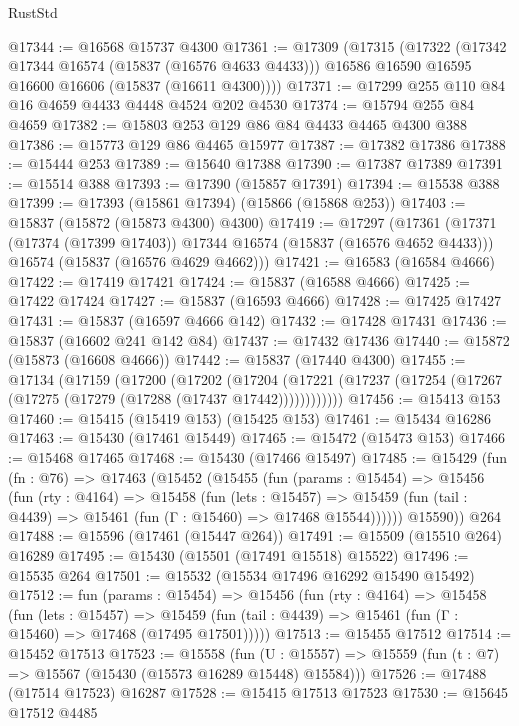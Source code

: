 \begin{lexlean}{RustStd}
\begin{coremodule}
@17344 := @16568 @15737 @4300
@17361 := @17309
    (@17315
      (@17322
        (@17342 @17344 @16574 (@15837 (@16576 @4633 @4433)))
        @16586
        @16590
        @16595
        @16600
        @16606
        (@15837 (@16611 @4300))))
@17371 := @17299 @255 @110 @84 @16 @4659 @4433 @4448 @4524 @202 @4530
@17374 := @15794 @255 @84 @4659
@17382 := @15803 @253 @129 @86 @84 @4433 @4465 @4300 @388
@17386 := @15773 @129 @86 @4465 @15977
@17387 := @17382 @17386
@17388 := @15444 @253
@17389 := @15640 @17388
@17390 := @17387 @17389
@17391 := @15514 @388
@17393 := @17390 (@15857 @17391)
@17394 := @15538 @388
@17399 := @17393 (@15861 @17394) (@15866 (@15868 @253))
@17403 := @15837 (@15872 (@15873 @4300) @4300)
@17419 := @17297
    (@17361
      (@17371 (@17374 (@17399 @17403)) @17344 @16574 (@15837 (@16576 @4652 @4433)))
      @16574
      (@15837 (@16576 @4629 @4662)))
@17421 := @16583 (@16584 @4666)
@17422 := @17419 @17421
@17424 := @15837 (@16588 @4666)
@17425 := @17422 @17424
@17427 := @15837 (@16593 @4666)
@17428 := @17425 @17427
@17431 := @15837 (@16597 @4666 @142)
@17432 := @17428 @17431
@17436 := @15837 (@16602 @241 @142 @84)
@17437 := @17432 @17436
@17440 := @15872 (@15873 (@16608 @4666))
@17442 := @15837 (@17440 @4300)
@17455 := @17134
    (@17159
      (@17200
        (@17202
          (@17204 (@17221 (@17237 (@17254 (@17267 (@17275 (@17279 (@17288 (@17437 @17442))))))))))))
@17456 := @15413 @153
@17460 := @15415 (@15419 @153) (@15425 @153)
@17461 := @15434 @16286
@17463 := @15430 (@17461 @15449)
@17465 := @15472 (@15473 @153)
@17466 := @15468 @17465
@17468 := @15430 (@17466 @15497)
@17485 := @15429
    (fun (fn : @76) =>
    @17463
      (@15452
        (@15455
          (fun (params : @15454) =>
          @15456
            (fun (rty : @4164) =>
            @15458
              (fun (lets : @15457) =>
              @15459 (fun (tail : @4439) => @15461 (fun (Γ : @15460) => @17468 @15544))))))
        @15590))
    @264
@17488 := @15596 (@17461 (@15447 @264))
@17491 := @15509 (@15510 @264) @16289
@17495 := @15430 (@15501 (@17491 @15518) @15522)
@17496 := @15535 @264
@17501 := @15532 (@15534 @17496 @16292 @15490 @15492)
@17512 := fun (params : @15454) =>
  @15456
    (fun (rty : @4164) =>
    @15458
      (fun (lets : @15457) =>
      @15459 (fun (tail : @4439) => @15461 (fun (Γ : @15460) => @17468 (@17495 @17501)))))
@17513 := @15455 @17512
@17514 := @15452 @17513
@17523 := @15558
    (fun (U : @15557) => @15559 (fun (t : @7) => @15567 (@15430 (@15573 @16289 @15448) @15584)))
@17526 := @17488 (@17514 @17523) @16287
@17528 := @15415 @17513 @17523
@17530 := @15645 @17512 @4485

\end{coremodule}
\end{lexlean}
